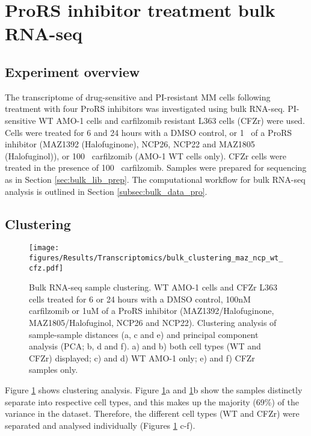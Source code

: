 \clearpage

\section{ProRS inhibitor treatment bulk RNA-seq}

\subsection{Experiment overview}
The transcriptome of drug-sensitive and PI-resistant MM cells following treatment with four ProRS inhibitors was investigated using bulk RNA-seq.
PI-sensitive WT AMO-1 cells and carfilzomib resistant L363 cells (CFZr) were used.
Cells were treated for 6 and 24 hours with a DMSO control, or 1\si{\micro\Molar} of a ProRS inhibitor (MAZ1392 (Halofuginone), NCP26, NCP22 and MAZ1805 (Halofuginol)), or 100\si{\nano\Molar} carfilzomib (AMO-1 WT cells only).
CFZr cells were treated in the presence of 100\si{\nano\Molar} carfilzomib.
Samples were prepared for sequencing as in Section \ref{sec:bulk_lib_prep}.
The computational workflow for bulk RNA-seq analysis is outlined in Section \ref{subsec:bulk_data_pro}.

\subsection{Clustering}

\begin{figure}[p]
\centering
\texttt{[image: figures/Results/Transcriptomics/bulk\_clustering\_maz\_ncp\_wt\_cfz.pdf]}
\caption[Bulk RNA-seq sample clustering]{Bulk RNA-seq sample clustering.
WT AMO-1 cells and CFZr L363 cells treated for 6 or 24 hours with a DMSO control, 100nM carfilzomib or 1uM of a ProRS inhibitor (MAZ1392/Halofuginone, MAZ1805/Halofuginol, NCP26 and NCP22).
Clustering analysis of sample-sample distances (a, c and e) and principal component analysis (PCA; b, d and f).
a) and b) both cell types (WT and CFZr) displayed; c) and d) WT AMO-1 only; e) and f) CFZr samples only.
}
\label{fig:clustering_bulk}\end{figure}

Figure \ref{fig:clustering_bulk} shows clustering analysis.
Figure \ref{fig:clustering_bulk}a and \ref{fig:clustering_bulk}b show the samples distinctly separate into respective cell types, and this makes up the majority (69\%) of the variance in the dataset.
Therefore, the different cell types (WT and CFZr) were separated and analysed individually (Figures \ref{fig:clustering_bulk} c-f).


